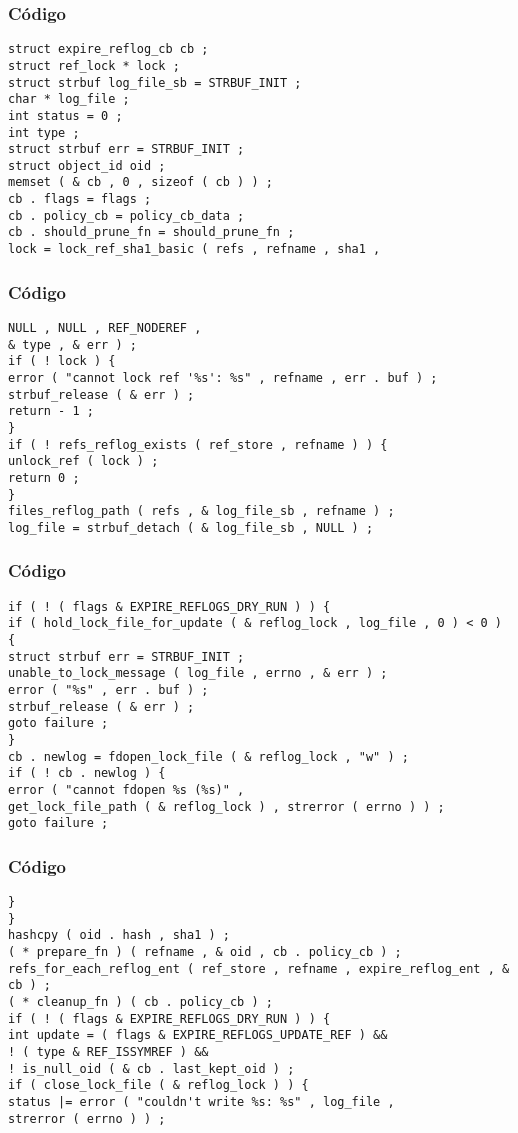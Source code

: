 \documentclass{beamer}
\begin{document}
\begin{frame}[fragile]
\frametitle{C\'odigo}
\begin{verbatim}
struct expire_reflog_cb cb ; 
struct ref_lock * lock ; 
struct strbuf log_file_sb = STRBUF_INIT ; 
char * log_file ; 
int status = 0 ; 
int type ; 
struct strbuf err = STRBUF_INIT ; 
struct object_id oid ; 
memset ( & cb , 0 , sizeof ( cb ) ) ; 
cb . flags = flags ; 
cb . policy_cb = policy_cb_data ; 
cb . should_prune_fn = should_prune_fn ; 
lock = lock_ref_sha1_basic ( refs , refname , sha1 , 
\end{verbatim}
\end{frame}
\begin{frame}[fragile]
\frametitle{C\'odigo}
\begin{verbatim}
NULL , NULL , REF_NODEREF , 
& type , & err ) ; 
if ( ! lock ) { 
error ( "cannot lock ref '%s': %s" , refname , err . buf ) ; 
strbuf_release ( & err ) ; 
return - 1 ; 
} 
if ( ! refs_reflog_exists ( ref_store , refname ) ) { 
unlock_ref ( lock ) ; 
return 0 ; 
} 
files_reflog_path ( refs , & log_file_sb , refname ) ; 
log_file = strbuf_detach ( & log_file_sb , NULL ) ; 
\end{verbatim}
\end{frame}
\begin{frame}[fragile]
\frametitle{C\'odigo}
\begin{verbatim}
if ( ! ( flags & EXPIRE_REFLOGS_DRY_RUN ) ) { 
if ( hold_lock_file_for_update ( & reflog_lock , log_file , 0 ) < 0 ) { 
struct strbuf err = STRBUF_INIT ; 
unable_to_lock_message ( log_file , errno , & err ) ; 
error ( "%s" , err . buf ) ; 
strbuf_release ( & err ) ; 
goto failure ; 
} 
cb . newlog = fdopen_lock_file ( & reflog_lock , "w" ) ; 
if ( ! cb . newlog ) { 
error ( "cannot fdopen %s (%s)" , 
get_lock_file_path ( & reflog_lock ) , strerror ( errno ) ) ; 
goto failure ; 
\end{verbatim}
\end{frame}
\begin{frame}[fragile]
\frametitle{C\'odigo}
\begin{verbatim}
} 
} 
hashcpy ( oid . hash , sha1 ) ; 
( * prepare_fn ) ( refname , & oid , cb . policy_cb ) ; 
refs_for_each_reflog_ent ( ref_store , refname , expire_reflog_ent , & cb ) ; 
( * cleanup_fn ) ( cb . policy_cb ) ; 
if ( ! ( flags & EXPIRE_REFLOGS_DRY_RUN ) ) { 
int update = ( flags & EXPIRE_REFLOGS_UPDATE_REF ) && 
! ( type & REF_ISSYMREF ) && 
! is_null_oid ( & cb . last_kept_oid ) ; 
if ( close_lock_file ( & reflog_lock ) ) { 
status |= error ( "couldn't write %s: %s" , log_file , 
strerror ( errno ) ) ; 
\end{verbatim}
\end{frame}
\end{document}
